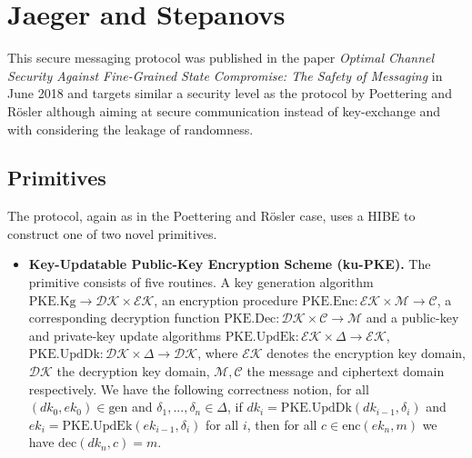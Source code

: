 \documentclass[11pt,a4paper,twoside,openright,bibliography=totoc]{scrbook}
\renewcommand{\t}{\text} %
\begin{document}

\section[Jaeger and Stepanovs]{Jaeger and Stepanovs~\cite{jaeger2018optimal}}
\label{sec:jaeger-stepanovs}

This secure messaging protocol was published in the paper
\textit{Optimal Channel Security Against Fine-Grained State Compromise: The Safety of Messaging}
in June 2018 and targets similar a security level as the protocol by
Poettering and Rösler although aiming at secure communication instead
of key-exchange and with considering the leakage of randomness.

\subsection{Primitives}
\label{sec:primitives-1}

The protocol, again as in the Poettering and Rösler case, uses a HIBE to construct
one of two novel primitives.
\begin{itemize}
\item \textbf{Key-Updatable Public-Key Encryption Scheme (ku-PKE).} The primitive
  consists of five routines. A key generation algorithm
  $\t{PKE.Kg} \rightarrow \mathcal{DK} \times \mathcal{EK}$, an encryption
  procedure $\t{PKE.Enc}: \mathcal{EK} \times \mathcal{M} \rightarrow \mathcal{C}$,
  a corresponding decryption function
  $\t{PKE.Dec}: \mathcal{DK} \times \mathcal{C} \rightarrow \mathcal{M}$ and
  a public-key and private-key update algorithms
  $\t{PKE.UpdEk}: \mathcal{EK} \times \Delta \rightarrow \mathcal{EK}$,
  $\t{PKE.UpdDk}: \mathcal{DK} \times \Delta \rightarrow \mathcal{DK}$, where
  $\mathcal{EK}$ denotes the encryption key domain, $\mathcal{DK}$ the
  decryption key domain, $\mathcal{M}, \mathcal{C}$ the message and
  ciphertext domain respectively. We have the following correctness notion, for all
  $(dk_0, ek_0) \in \t{gen}$ and $\delta_1,...,\delta_n \in \Delta$, if
  $dk_i = \t{PKE.UpdDk}(dk_{i-1},\delta_i)$ and
  $ek_i = \t{PKE.UpdEk}(ek_{i-1},\delta_i)$ for all $i$, then for all
  $c \in \t{enc}(ek_n,m)$ we have $\t{dec}(dk_n,c)=m$.
\end{itemize}
\end{document}
